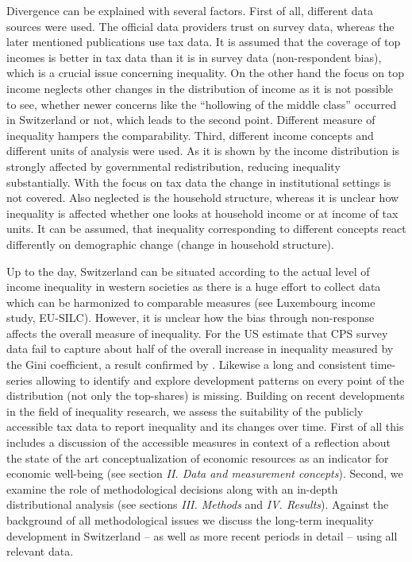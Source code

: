 \documentclass[twoside]{article}\usepackage[]{graphicx}\usepackage[]{color}
\begin{document}
\begin{multicols}{2}
Divergence can be explained with several factors. First of all, different data sources were used. The official data providers trust on survey data, whereas the later mentioned publications use tax data. It is assumed that the coverage of top incomes is better in tax data than it is in survey data (non-respondent bias), which is a crucial issue concerning inequality. On the other hand the focus on top income neglects other changes in the distribution of income as it is not possible to see, whether newer concerns like the ``hollowing of the middle class'' occurred in Switzerland or not, which leads to the second point. Different measure of inequality hampers the comparability. Third, different income concepts and different units of analysis were used. As it is shown by \citet{modetta_einkommensungleichheit_2012} the income distribution is strongly affected by governmental redistribution, reducing inequality substantially. With the focus on tax data the change in institutional settings is not covered. Also neglected is the household structure, whereas it is unclear how inequality is affected whether one looks at household income or at income of tax units. It can be assumed, that inequality corresponding to different concepts react differently on demographic change (change in household structure). 


Up to the day, Switzerland can be situated according to the actual level of income inequality in western societies as there is a huge effort to collect data which can be harmonized to comparable measures (see Luxembourg income study, EU-SILC). However, it is unclear how the bias through non-response affects the overall measure of inequality. For the US \citet{atkinson_top_2009} estimate that CPS survey data fail to capture about half of the overall increase in inequality measured by the Gini coefficient, a result confirmed by \citet{alvaredo_note_2011}. Likewise a long and consistent time-series allowing to identify and explore development patterns on every point of the distribution (not only the top-shares) is missing. Building on recent developments in the field of inequality research, we assess the suitability of the publicly accessible tax data to report inequality and its changes over time. First of all this includes a discussion of the accessible measures in context of a reflection about the state of the art conceptualization of economic resources as an indicator for economic well-being (see section \textit{II. Data and measurement concepts}). Second, we examine the role of methodological decisions along with an in-depth distributional analysis (see sections \textit{III. Methods} and \textit{IV. Results}). Against the background of all methodological issues we discuss the long-term inequality development in Switzerland -- as well as more recent periods in detail -- using all relevant data.


\end{multicols}
\end{document}
